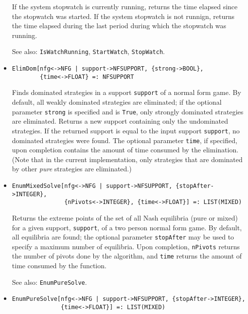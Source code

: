 \begin{itemize}
\bd
If the system stopwatch is currently running, returns the
time elapsed since the stopwatch was started.  If the system stopwatch
is not runnign, returns the time elapsed during the last period during which
the stopwatch was running.
\item
[See also:] {\tt IsWatchRunning}, {\tt StartWatch}, {\tt StopWatch}.
\ed

\item
\protect \large \begin{verbatim}
ElimDom[nfg<->NFG | support->NFSUPPORT, {strong->BOOL}, 
        {time<->FLOAT} =: NFSUPPORT
\end{verbatim} \normalsize

\bd
Finds dominated strategies in a support \verb+support+ of a normal
form game.  By default, all weakly dominated strategies are eliminated;
if the optional parameter \verb+strong+ is specified and is \verb+True+,
only strongly dominated strategies are eliminated.  Returns a new support
containing only the undominated strategies.  If the returned support
is equal to the input support \verb+support+, no dominated strategies were
found.  The optional parameter \verb+time+, if specified, upon completion
contains the amount of time consumed by the elimination.  (Note that in
the current implementation, only strategies that are dominated by
other {\em pure} strategies are eliminated.)  
\ed

\item
\protect \large \begin{verbatim}
EnumMixedSolve[nfg<->NFG | support->NFSUPPORT, {stopAfter->INTEGER},
               {nPivots<->INTEGER}, {time<->FLOAT}] =: LIST(MIXED)
\end{verbatim}\normalsize

\bd
Returns the extreme points of the set of all Nash equilibria (pure or
mixed) for a given support, \verb+support+, of a two person normal form
game.  By default, all equilibria are found; the optional parameter
\verb+stopAfter+ may be used to specify a maximum number of
equilibria.  Upon completion, \verb+nPivots+ returns the number of
pivots done by the algorithm, and
\verb+time+ returns the amount of time consumed by the function.
\item
[See also:] {\tt EnumPureSolve}.
\ed

\item
\protect \large \begin{verbatim}
EnumPureSolve[nfg<->NFG | support->NFSUPPORT, {stopAfter->INTEGER}, 
              {time<->FLOAT}] =: LIST(MIXED) 
\end{verbatim}\normalsize


\end{itemize}

